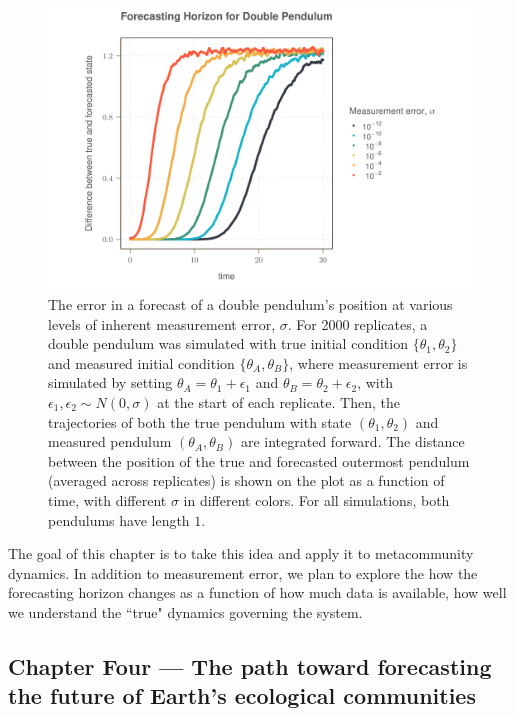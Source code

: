 \documentclass[]{article}
\begin{document}
\begin{figure}[h]
    \centering
    \includegraphics[width=17cm]{figs/forecasting_horizon.png}
    \caption{The error in a forecast of a double pendulum's position at various levels of inherent measurement error, $\sigma$. For 2000 replicates, a double pendulum was simulated with true initial condition $\{ \theta_1, \theta_2 \}$ and measured initial condition $\{\theta_A, \theta_B \}$, where measurement error is simulated by setting $\theta_A = \theta_1 + \epsilon_1$ and $\theta_B = \theta_2 + \epsilon_2$, with $\epsilon_1, \epsilon_2 \sim N(0, \sigma)$ at the start of each replicate. Then, the trajectories of both the true pendulum with state $(\theta_1, \theta_2)$ and measured pendulum $(\theta_A, \theta_B)$ are integrated forward. The distance between the position of the true and forecasted outermost pendulum (averaged across replicates) is shown on the plot as a function of time, with different $\sigma$ in different colors. For all simulations, both pendulums have length $1$.}
    \label{fig:forecasting_horizon}
\end{figure}

The goal of this chapter is to take this idea and apply it to metacommunity dynamics. In addition to measurement error, we plan to explore the how the forecasting horizon changes as a function of how much data is available, how well we understand the ``true" dynamics governing the system. 

\subsection{Chapter Four --- The path toward forecasting the future of Earth's ecological communities}
\end{document}
